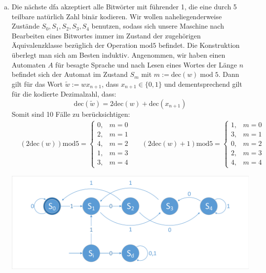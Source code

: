 \documentclass{article}
\begin{document}
\begin{enumerate}[a)]
		\item Die nächste dfa akzeptiert alle Bitwörter mit führender 1, die eine durch 5 teilbare natürlich Zahl binär kodieren. Wir wollen naheliegenderweise Zustände $S_0, S_1, S_2, S_3, S_4$ benutzen, sodass sich unsere Maschine nach Bearbeiten eines Bitwortes immer im Zustand der zugehörigen Äquivalenzklasse bezüglich der Operation $\textrm{mod} 5$ befindet. Die Konstruktion überlegt man sich am Besten induktiv. Angenommen, wir haben einen Automaten $A$ für besagte Sprache und nach Lesen eines Wortes der Länge $n$ befindet sich der Automat im Zustand $S_m$ mit $m:= \textrm{dec}(w)\; \textrm{mod} \; 5$. Dann gilt für das Wort $\tilde{w} := wx_{n+1}$, dass $x_{n+1} \in \{0,1\}$ und dementsprechend gilt für die kodierte Dezimalzahl, dass:
		\begin{equation}
		\textrm{dec}(\tilde{w}) = 2\textrm{dec}(w) + \textrm{dec}(x_{n+1})
		\end{equation}
		Somit sind 10 Fälle zu berücksichtigen:
		\begin{align}
		&(2\textrm{dec}(w)) \textrm{mod} 5 = \begin{cases}
		0,&m = 0\\ 2,&m = 1\\4,&m=2\\1,&m=3\\3,&m=4
		\end{cases}
		&& (2\textrm{dec}(w)+1)\textrm{mod} 5 = \begin{cases}
		1,&m=0\\3,&m=1\\0,&m=2\\2,&m=3\\4,&m=4
		\end{cases}
		\end{align}
		
		\includegraphics[width=\textwidth]{dfa4.pdf}
		
	\end{enumerate}
	
	
\end{document}
